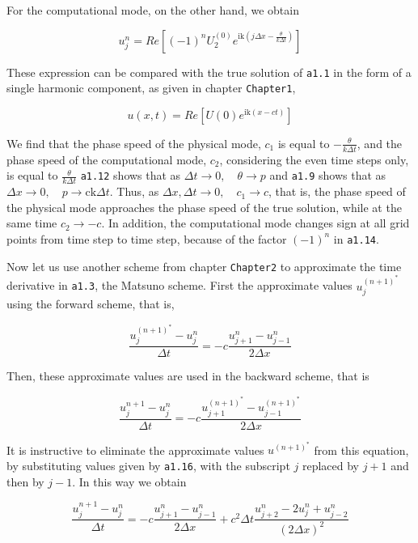 For the computational mode, on the other hand, we obtain

 \[u_{j}^{n} = Re\left\lbrack \left( - 1 \right)^{n}U_{2}^{\left( 0 \right)}
e^{\text{ik}\left( j\Delta x - \frac{\theta}{k\Delta t} \right)} \right\rbrack\]

These expression can be compared with the true solution of \texttt{a1.1}
in the form of a single harmonic component, as given in chapter
\texttt{Chapter1},

 \[u\left( x,t \right) = Re\left\lbrack U\left( 0 \right)e^{\text{ik}
\left( x - c t \right)} \right\rbrack\]

We find that the phase speed of the physical mode, \(c_{1}\) is equal to
\(- \frac{\theta}{k\Delta t}\), and the phase speed of the
computational mode, \(c_{2}\), considering the even time steps only, is
equal to \(\frac{\theta}{k\Delta t}\) \texttt{a1.12} shows that as
\(\Delta t \rightarrow 0, \quad \theta \rightarrow p\) and \texttt{a1.9}
shows that as
\(\Delta x \rightarrow 0, \quad p  \rightarrow \text{ck}\Delta t\).
Thus, as \(\Delta x,\Delta t \rightarrow 0, \quad c_{1} \rightarrow c\),
that is, the phase speed of the physical mode approaches the phase speed
of the true solution, while at the same time \(c_{2} \rightarrow - c\).
In addition, the computational mode changes sign at all grid points
from time step to time step, because of the factor
\(\left( - 1 \right)^{n}\) in \texttt{a1.14}.

Now let us use another scheme from chapter \texttt{Chapter2} to
approximate the time derivative in \texttt{a1.3}, the Matsuno scheme.
First the approximate values \(u_{j}^{\left( n + 1 \right)^{*}}\) using
the forward scheme, that is,

 \[\frac{u_{j}^{\left( n + 1 \right)^{*}} - u_{j}^{n}}{\Delta t}
= - c\frac{u_{j + 1}^{n} - u_{j - 1}^{n}}{2\Delta x}\]

Then, these approximate values are used in the backward scheme, that is

 \[\frac{u_{j}^{n + 1} - u_{j}^{n}}{\Delta t} =
- c\frac{u_{j + 1}^{\left( n + 1 \right)^{*}} - u_{j - 1}^{\left( n + 1 \right)^{*}}}{2\Delta x}\]

It is instructive to eliminate the approximate values
\(u^{\left( n + 1 \right)^{*}}\) from this equation, by substituting
values given by \texttt{a1.16}, with the subscript \(j\) replaced by
\(j + 1\) and then by \( j - 1\). In this way we obtain

 \[\frac{u_{j}^{n + 1} - u_{j}^{n}}{\Delta t} =
- c\frac{u_{j + 1}^{n} - u_{j - 1}^{n}}{2\Delta x} +
c^{2}\Delta t\frac{u_{j + 2}^{n} -
  {2u}_{j}^{n} + u_{j - 2}^{n}}{\left( 2\Delta x \right)^{2}}\]

